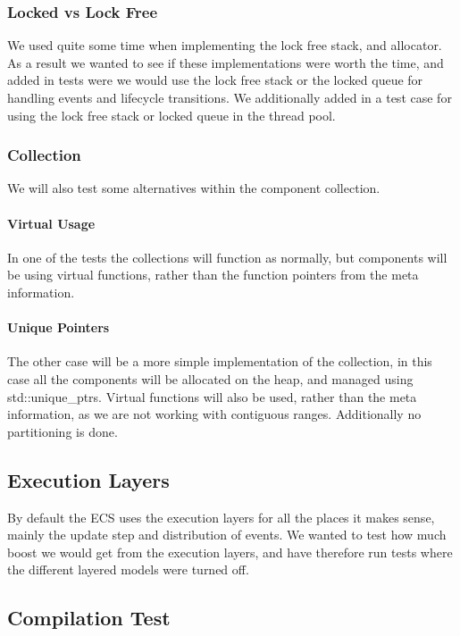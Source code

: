 \subsubsection{Locked vs Lock Free}
We used quite some time when implementing the lock free stack, and allocator.
As a result we wanted to see if these implementations were worth the time,
and added in tests were we would use the lock free stack or the locked queue
for handling events and lifecycle transitions.
We additionally added in a test case for using the lock free stack or locked queue
in the thread pool.

\subsubsection{Collection}
We will also test some alternatives within the component collection.

\paragraph{Virtual Usage}
In one of the tests the collections will function as normally, but
components will be using virtual functions, rather than the function pointers
from the meta information.

\paragraph{Unique Pointers}
The other case will be a more simple implementation of the collection,
in this case all the components will be allocated on the heap, and managed
using std::unique\_ptrs.
Virtual functions will also be used, rather than the meta information,
as we are not working with contiguous ranges. Additionally no partitioning is done.

\subsection{Execution Layers}
By default the ECS uses the execution layers for all the places it makes sense,
mainly the update step and distribution of events.
We wanted to test how much boost we would get from the execution layers,
and have therefore run tests where the different layered models were turned off.

\subsection{Compilation Test}

